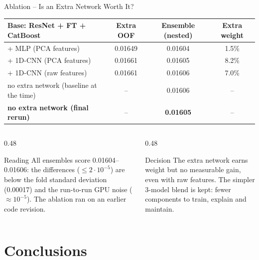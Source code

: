 \documentclass[9pt,aspectratio=169]{beamer}
\begin{document}
\begin{frame}{Ablation -- Is an Extra Network Worth It?}
  \centering
  \small
  \begin{tabular}{@{}lccc@{}}
    \toprule
    \textbf{Base: ResNet + FT + CatBoost} & \textbf{Extra OOF} & \textbf{Ensemble (nested)} & \textbf{Extra weight} \\
    \midrule
    + MLP (PCA features) & 0.01649 & 0.01604 & 1.5\% \\
    + 1D-CNN (PCA features) & 0.01661 & 0.01605 & 8.2\% \\
    + 1D-CNN (raw features) & 0.01661 & 0.01606 & 7.0\% \\
    no extra network (baseline at the time) & -- & 0.01606 & -- \\
    \textbf{no extra network (final rerun)} & -- & \textbf{0.01605} & -- \\
    \bottomrule
  \end{tabular}
  \vspace{3mm}

  \begin{columns}[T]
    \begin{column}{0.48\textwidth}
      \begin{block}{Reading}
        \small All ensembles score 0.01604--0.01606: the differences ($\le 2\cdot10^{-5}$) are below the fold standard deviation (0.00017) and the run-to-run GPU noise ($\approx 10^{-5}$). The ablation ran on an earlier code revision.
      \end{block}
    \end{column}
    \begin{column}{0.48\textwidth}
      \begin{exampleblock}{Decision}
        \small The extra network earns weight but no measurable gain, even with raw features. The simpler 3-model blend is kept: fewer components to train, explain and maintain.
      \end{exampleblock}
    \end{column}
  \end{columns}
\end{frame}

\section{Conclusions}
\end{document}
